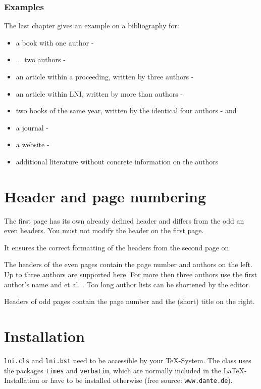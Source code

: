\documentclass[english]{lni}
\begin{document}
\subsubsection{Examples}
The last chapter gives an example on a bibliography for:
\begin{itemize}
\item a book with one author - \cite{Ez10}
\item ... two authors - \cite{AB00}
\item an article within a proceeding, written by three authors - \cite{ABC01}
\item an article within LNI, written by more than authors - \cite{Az09}
\item two books of the same year, written by the identical four authors - \cite{Wa14} and \cite{Wa14b}
\item a journal - \cite{Gl06}
\item a website - \cite{GI14}
\item additional literature without concrete information on the authors \cite{XX14}
\end{itemize} 

\section{Header and page numbering}
The first page has its own already defined header and differs from the odd an even headers. You must not modify the header on the first page.

It ensures the correct formatting of the headers from the second page on. 

The headers of the even pages contain the page number and authors on the left. Up to three authors are supported here. For more then three authors use the first author's name and et al. .
Too long author lists can be shortened by the editor.

Headers of odd pages contain the page number and the (short) title on the right.

\section{Installation}

\texttt{lni.cls} and \texttt{lni.bst} need to be accessible by your \TeX-System. The class uses the packages \texttt{times} and \texttt{verbatim}, which are normally included in the \LaTeX-Installation or have to be installed otherwise (free source: \texttt{www.dante.de}).

%

\end{document}
